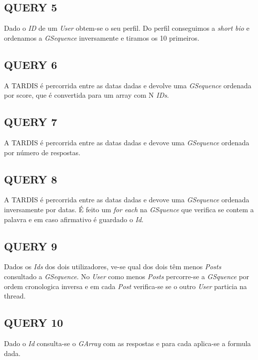 \documentclass[letterpaper, 10 pt, conference]{IEEEtran}  %
\begin{document}
\subsection{QUERY 5}

Dado o \textit{ID} de um \textit{User} obtem-se o seu perfil. Do perfil conseguimos a \textit{short bio} e ordenamos a \textit{GSequence} inversamente e tiramos os 10 primeiros.

\subsection{QUERY 6}

A TARDIS é percorrida entre as datas dadas e devolve uma \textit{GSequence} ordenada por score, que é convertida para um array com N \textit{IDs}.

\subsection{QUERY 7}

A TARDIS é percorrida entre as datas dadas e devove uma \textit{GSequence} ordenada por número de respostas.

\subsection{QUERY 8}

A TARDIS é percorrida entre as datas dadas e devove uma \textit{GSequence} ordenada inversamente por datas. É feito um \textit{for each} na \textit{GSquence} que verifica se contem a palavra e em caso afirmativo é guardado o \textit{Id}.

\subsection{QUERY 9}

Dados os \textit{Ids} dos dois utilizadores, ve-se qual dos dois têm menos \textit{Posts} consultado a \textit{GSequence}. No \textit{User} como menos \textit{Posts} percorre-se a \textit{GSquence} por ordem cronologica inversa e em cada \textit{Post} verifica-se se o outro \textit{User} particia na thread.

\subsection{QUERY 10}

Dado o \textit{Id} consulta-se o \textit{GArray} com as respostas e para cada aplica-se a formula dada.
\end{document}
